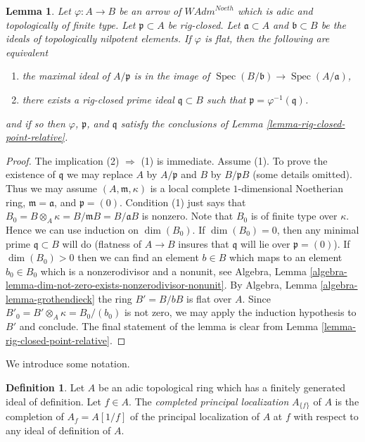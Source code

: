 \documentclass{stacks-project}
\theoremstyle{plain}
\newtheorem{lemma}[subsection]{Lemma}
\theoremstyle{definition}
\newtheorem{definition}[subsection]{Definition}
\theoremstyle{remark}
\numberwithin{equation}{subsection}
\def\Spec{\mathop{\mathrm{Spec}}}
\begin{document}
\begin{lemma}
\label{lemma-rig-closed-point-in-image}
Let $\varphi : A \to B$ be an arrow of $\textit{WAdm}^{Noeth}$
which is adic and topologically of finite type.
Let $\mathfrak p \subset A$ be rig-closed.
Let $\mathfrak a \subset A$ and $\mathfrak b \subset B$
be the ideals of topologically nilpotent elements. If $\varphi$
is flat, then the following are equivalent
\begin{enumerate}
\item the maximal ideal of $A/\mathfrak p$ is in the image of
$\Spec(B/\mathfrak b) \to \Spec(A/\mathfrak a)$,
\item there exists a rig-closed prime ideal $\mathfrak q \subset B$
such that $\mathfrak p = \varphi^{-1}(\mathfrak q)$.
\end{enumerate}
and if so then $\varphi$, $\mathfrak p$, and $\mathfrak q$
satisfy the conclusions of Lemma \ref{lemma-rig-closed-point-relative}.
\end{lemma}

\begin{proof}
The implication (2) $\Rightarrow$ (1) is immediate. Assume (1).
To prove the existence of $\mathfrak q$
we may replace $A$ by $A/\mathfrak p$ and $B$ by $B/\mathfrak p B$
(some details omitted). Thus we may assume $(A, \mathfrak m, \kappa)$
is a local complete $1$-dimensional Noetherian ring,
$\mathfrak m = \mathfrak a$, and $\mathfrak p = (0)$. Condition (1)
just says that $B_0 = B \otimes_A \kappa = B/\mathfrak m B = B/\mathfrak a B$
is nonzero. Note that $B_0$ is of finite type over $\kappa$.
Hence we can use induction on $\dim(B_0)$.
If $\dim(B_0) = 0$, then any minimal prime $\mathfrak q \subset B$
will do (flatness of $A \to B$ insures that $\mathfrak q$ will
lie over $\mathfrak p = (0)$).
If $\dim(B_0) > 0$ then we can find an element $b \in B$
which maps to an element $b_0 \in B_0$ which is a nonzerodivisor
and a nonunit, see Algebra, Lemma
\ref{algebra-lemma-dim-not-zero-exists-nonzerodivisor-nonunit}.
By Algebra, Lemma \ref{algebra-lemma-grothendieck}
the ring $B' = B/bB$ is flat over $A$. Since
$B'_0 = B' \otimes_A \kappa = B_0/(b_0)$ is not zero,
we may apply the induction hypothesis to $B'$ and conclude.
The final statement of the lemma is clear from
Lemma \ref{lemma-rig-closed-point-relative}.
\end{proof}

\noindent
We introduce some notation.

\begin{definition}
\label{definition-completed-principal-localization}
Let $A$ be an adic topological ring which has a finitely generated ideal
of definition. Let $f \in A$. The {\it completed principal localization}
$A_{\{f\}}$ of $A$ is the completion of $A_f = A[1/f]$
of the principal localization of $A$ at $f$ with respect to any
ideal of definition of $A$.
\end{definition}
\end{document}
